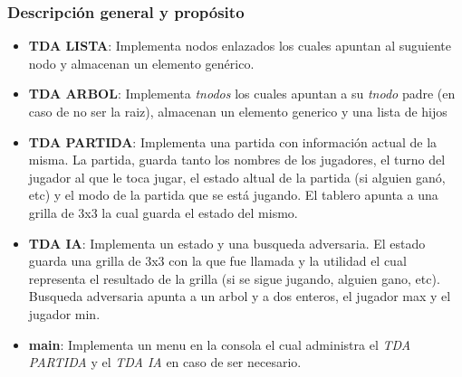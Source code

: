 \documentclass[12pt,twocolum,a4paper]{article}
\begin{document}
\subsubsection{Descripci\'on general y prop\'osito}
\begin{itemize}
    \item {\bf TDA LISTA}: Implementa nodos enlazados los cuales apuntan al suguiente nodo y almacenan un elemento gen\'erico.
	\item {\bf TDA ARBOL}: Implementa \emph{tnodos} los cuales apuntan a su \emph{tnodo} padre (en caso de no ser la raiz), almacenan un elemento generico y una lista de hijos
    \item {\bf TDA PARTIDA}: Implementa una partida con informaci\'on actual de la misma. La partida, guarda tanto los nombres de los jugadores, el turno del jugador al que le toca jugar, el estado altual de la partida (si alguien gan\'o, etc) y el modo de la partida que se est\'a jugando. El tablero apunta a una grilla de 3x3 la cual guarda el estado del mismo.
    \item {\bf TDA IA}: Implementa un estado y una busqueda adversaria. El estado guarda una grilla de 3x3 con la que fue llamada y la utilidad el cual representa el resultado de la grilla (si se sigue jugando, alguien gano, etc). Busqueda adversaria apunta a un arbol y a dos enteros, el jugador max y el jugador min.
    \item {\bf main}: Implementa un menu en la consola el cual administra el {\itshape TDA PARTIDA} y el {\itshape TDA IA} en caso de ser necesario.
\end{itemize}
\end{document}
